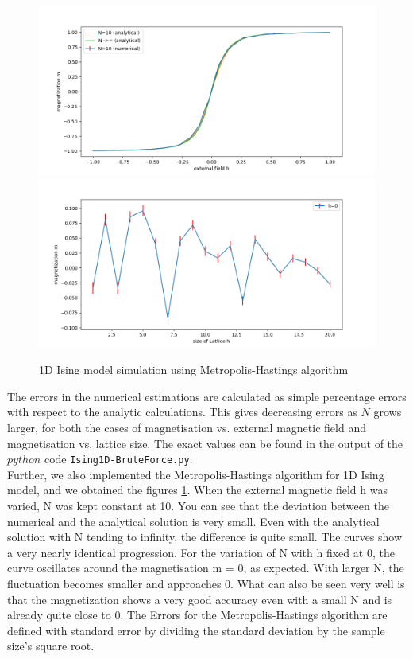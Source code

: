 \documentclass{article}
\begin{document}
\begin{enumerate}
\begin{figure}[h!]
    \includegraphics[width=.5\textwidth]{num_vs_anal_N10.png}\hfill
    \includegraphics[width=.5\textwidth]{h_0_10000samples.png}\hfill
    \caption{1D Ising model simulation using Metropolis-Hastings algorithm}
    \label{fig:metropolishastings}
\end{figure}
    The errors in the numerical estimations are calculated as simple percentage errors with respect to the analytic calculations. This gives decreasing errors as $N$ grows larger, for both the cases of magnetisation vs. external magnetic field and magnetisation vs. lattice size. The exact values can be found in the output of the $python$ code \verb|Ising1D-BruteForce.py|.\\
    Further, we also implemented the Metropolis-Hastings algorithm for 1D Ising model, and we obtained the figures \ref{fig:metropolishastings}.
    When the external magnetic field h was varied, N was kept constant at 10. You can see that the deviation between the numerical and the analytical solution is very small. Even with the analytical solution with N tending to infinity, the difference is quite small. The curves show a very nearly identical progression. For the variation of N with h fixed at 0, the curve oscillates around the magnetisation m = 0, as expected. With larger N, the fluctuation becomes smaller and approaches 0. What can also be seen very well is that the magnetization shows a very good accuracy even with a small N and is already quite close to 0. The Errors for the Metropolis-Hastings algorithm are defined with standard error by dividing the standard deviation by the sample size's square root.
\end{enumerate}
\end{document}

